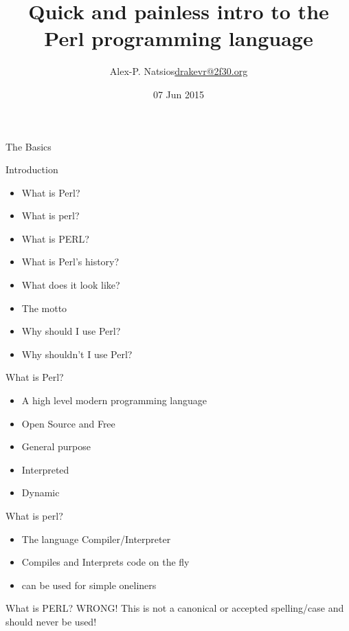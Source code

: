 \documentclass{beamer}
\title{Quick and painless intro to the Perl programming language}
\author{\texorpdfstring{Alex-P. Natsios\newline\url{drakevr@2f30.org}}{Author}}
\institute{GreekLUG}
\date{07 Jun 2015}
\begin{document}
    \begin{frame}
       \titlepage
    \end{frame}

    \begin{frame}
        \center\huge The Basics
    \end{frame}

    \begin{frame}{Introduction}
        \begin{itemize}
            \item What is Perl? 
            \item What is perl? 
            \item What is PERL?
            \item What is Perl's history?
            \item What does it look like?
            \item The motto
            \item Why should I use Perl?
            \item Why shouldn't I use Perl?
        \end{itemize}
    \end{frame}

    \begin{frame}{What is Perl?}
        \begin{itemize}
            \item A high level modern programming language
            \item Open Source and Free
            \item General purpose
            \item Interpreted
            \item Dynamic
        \end{itemize}
    \end{frame}

    \begin{frame}{What is perl?}
        \begin{itemize}
            \item The language Compiler/Interpreter
            \item Compiles and Interprets code on the fly
            \item can be used for simple oneliners
        \end{itemize}
    \end{frame}

    \begin{frame}{What is PERL?}
        \center\huge {\color{red}WRONG!} This is not a canonical or accepted spelling/case and should never be used!
    \end{frame}
\end{document}
